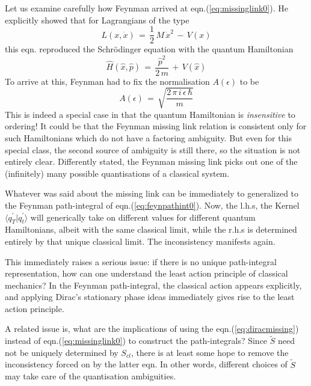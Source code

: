 \documentclass[a4paper]{JHEP3}
\newcommand{\be}{\begin{equation}}
\newcommand{\ee}{\end{equation}}
\begin{document}
Let us
examine carefully how Feynman arrived at eqn.(\ref{eq:missinglink0}).
He explicitly showed that for Lagrangians of the type
\be
\label{eq:quadL}
L(x,{\dot x})\,=\,\frac{1}{2}\,M\,{\dot x}^2\,-\,V(x)
\ee
this eqn. reproduced the Schr\"odinger equation with the quantum Hamiltonian 
\be
\label{eq:quadH}
{\hat H({\hat x},{\hat p})}\,=\,\frac{{\hat p}^2}{2\,m}\,+\,V({\hat x})
\ee
To arrive at this, Feynman had to fix the normalisation $A(\epsilon)$ to be
\be
\label{eq:normfeyn}
A(\epsilon)\,=\,\sqrt{\frac{2\,\pi\,i\,\epsilon\,\hbar}{m}}
\ee
This is indeed a special case in that the quantum Hamiltonian is {\it insensitive} to ordering! It could be that the Feynman missing link
relation is consistent
only for such Hamiltonians which do not have a factoring ambiguity. But even for this special class, the second source of ambiguity is
still there, so the situation is not entirely clear. Differently stated, the Feynman missing link picks out one of the
(infinitely) many possible quantisations of a classical system. 

Whatever was said about the missing link can be immediately to generalized to the Feynman path-integral of eqn.(\ref{eq:feynpathint0}).
Now, the l.h.s, the Kernel $\langle q_T^\prime|q_t^\prime\rangle$ will generically take on different values for different quantum Hamiltonians,
albeit with the same classical limit, while the r.h.s is determined entirely by that unique classical limit. The inconsistency manifests
again.

This immediately raises a serious issue: if there is no unique path-integral representation, how can one understand the least action principle
of classical mechanics? In the Feynman path-integral, the classical action appears explicitly, and applying Dirac's stationary phase ideas
immediately gives rise to the least action principle.

A related issue is, what are the implications of using the eqn.(\ref{eq:diracmissing}) instead of eqn.(\ref{eq:missinglink0}) to
construct the path-integrals? Since ${\tilde S}$ need not be uniquely determined by $S_{cl}$, there is at least some hope to remove
the inconsistency forced on by the latter eqn. In other words, different choices of ${\tilde S}$ may take care of the quantisation ambiguities.
\end{document}
